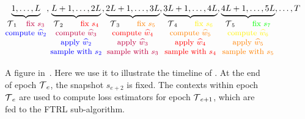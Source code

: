 \begin{figure*}[hbt]
\begin{align*}
\underbrace{1,\dots,L}_{\small{\begin{matrix}\Time_1\quad \text{\small \color{purple}fix $s_3$}\\\text{\color{blue}compute $\widehat{w}_{2}$}\\\end{matrix}}},\underbrace{L+1,\dots, 2L}_{\small{\begin{matrix}\Time_2\quad\quad \text{\small \color{red}fix $s_4$}\\\text{\color{purple}compute $\widehat{w}_3$}\\\text{\color{blue}apply $\widehat{w}_2$}\\\text{\color{blue} sample with $s_2$}\end{matrix}}},\underbrace{2L+1,\dots, 3L}_{\small{\begin{matrix}\Time_3\quad\quad \text{\small \color{orange}fix $s_5$}\\\text{\color{red}compute $\widehat{w}_4$}\\\text{\color{purple}apply $\widehat{w}_3$}\\\text{\color{purple}sample with $s_3$}\end{matrix}}},
\underbrace{3L+1,\dots, 4L}_{\small{\begin{matrix}\Time_4\quad\quad \text{\small \color{yellow}fix $s_6$}\\\text{\color{orange}compute $\widehat{w}_5$}\\\text{\color{red}apply $\widehat{w}_4$}\\\text{\color{red}sample with $s_4$}\end{matrix}}},
\underbrace{4L+1,\dots, 5L}_{\small{\begin{matrix}\Time_5\quad\quad \text{\small \color{green}fix $s_7$}\\\text{\color{yellow}compute $\widehat{w}_6$}\\\text{\color{orange}apply $\widehat{w}_5$}\\\text{\color{orange}sample with $s_5$}\end{matrix}}},\dots, T
\end{align*}
\caption{A figure in~\citet{Sch23}. Here we use it to  illustrate the timeline of . At the end of epoch $\operatorname{\mathcal{T}}_e$, the snapshot $s_{e+2}$ is fixed. The contexts within epoch $\operatorname{\mathcal{T}}_{e}$ are used to compute loss estimators for epoch $\operatorname{\mathcal{T}}_{e+1}$, which are fed to the FTRL sub-algorithm.}
\end{figure*}

